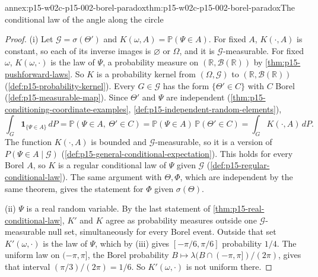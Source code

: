 \begin{annexitem}{annex:p15-w02c-p15-002-borel-paradox}{thm:p15-w02c-p15-002-borel-paradox}{The conditional law of the angle along the circle}
\begin{proof}
(i) Let \(\mathcal G=\sigma(\Theta')\) and \(K(\omega,A)=\mathbb P(\Psi\in A)\).
For fixed \(A\), \(K(\cdot,A)\) is constant, so each of its inverse images
is \(\varnothing\) or \(\Omega\), and it is \(\mathcal G\)-measurable.
For fixed \(\omega\), \(K(\omega,\cdot)\) is the law of \(\Psi\), a
probability measure on \((\mathbb R,\mathcal B(\mathbb R))\) by
\cref{thm:p15-pushforward-laws}. So \(K\) is a probability kernel from
\((\Omega,\mathcal G)\) to \((\mathbb R,\mathcal B(\mathbb R))\)
(\cref{def:p15-probability-kernel}). Every \(G\in\mathcal G\) has the
form \(\{\Theta'\in C\}\) with \(C\) Borel (\cref{def:p15-measurable-map}).
Since \(\Theta'\) and \(\Psi\) are independent
(\cref{thm:p15-conditioning-coordinate-examples},
\cref{def:p15-independent-random-elements}),
\[
 \int_G\mathbf1_{\{\Psi\in A\}}\,dP=\mathbb P(\Psi\in A,\ \Theta'\in C)
 =\mathbb P(\Psi\in A)\,\mathbb P(\Theta'\in C)=\int_GK(\cdot,A)\,dP .
\]
The function \(K(\cdot,A)\) is bounded and \(\mathcal G\)-measurable, so it
is a version of \(P(\Psi\in A\mid\mathcal G)\)
(\cref{def:p15-general-conditional-expectation}). This holds for every
Borel \(A\), so \(K\) is a regular conditional law of \(\Psi\) given
\(\mathcal G\) (\cref{def:p15-regular-conditional-law}). The same argument
with \(\Theta,\Phi\), which are independent by the same theorem, gives the
statement for \(\Phi\) given \(\sigma(\Theta)\).

(ii) \(\Psi\) is a real random variable. By the last statement of
\cref{thm:p15-real-conditional-law}, \(K'\) and \(K\) agree as probability
measures outside one \(\mathcal G\)-measurable null set, simultaneously
for every Borel event. Outside that set \(K'(\omega,\cdot)\) is the law of
\(\Psi\), which by (iii) gives \([-\pi/6,\pi/6]\) probability \(1/4\). The
uniform law on \((-\pi,\pi]\), the Borel probability
\(B\mapsto\lambda(B\cap(-\pi,\pi])/(2\pi)\), gives that interval
\((\pi/3)/(2\pi)=1/6\). So \(K'(\omega,\cdot)\) is not uniform there.


\end{proof}
\end{annexitem}
